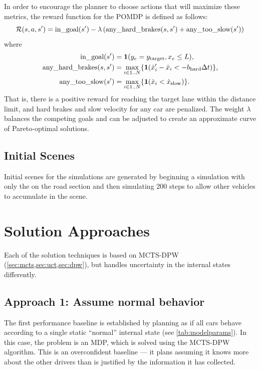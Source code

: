 In order to encourage the planner to choose actions that will maximize these metrics, the reward function for the POMDP is defined as follows: 
\begin{equation} \label{eqn:reward}
    \mathcal{R}(s, a, s') = \text{in\_goal}(s') - \lambda \left(\text{any\_hard\_brakes}(s, s') + \text{any\_too\_slow}(s')\right)
\end{equation}
where
\begin{align}
    \text{in\_goal}(s') &= \mathbf{1}({y}_e = y_\text{target}, {x}_e \leq L) \text{,}\\
    \text{any\_hard\_brakes}(s,s') &= \max_{i \in 1..N}\{\mathbf{1}({\dot{x}}_i' - {\dot{x}}_i < -b_\text{hard} \Delta t) \} \text{,}\\
    \text{any\_too\_slow}(s') &= \max_{i \in 1..N} \{\mathbf{1}({\dot{x}}_i < \dot{x}_\text{slow})\} \text{.}
\end{align}
That is, there is a positive reward for reaching the target lane within the distance limit, and hard brakes and slow velocity for any car are penalized.
The weight $\lambda$ balances the competing goals and can be adjusted to create an approximate curve of Pareto-optimal solutions.

\subsection{Initial Scenes} \label{sec:initial}

Initial scenes for the simulations are generated by beginning a simulation with only the \av{} on the road section and then simulating 200 steps to allow other vehicles to accumulate in the scene.

\section{Solution Approaches} \label{sec:solution}

Each of the solution techniques is based on MCTS-DPW (\cref{sec:mcts,sec:uct,sec:dpw}), but handles uncertainty in the internal states differently.

\subsection{Approach 1: Assume normal behavior}

The first performance baseline is established by planning as if all cars behave according to a single static ``normal'' internal state (see \cref{tab:modelparams}).
In this case, the problem is an MDP, which is solved using the MCTS-DPW algorithm.
This is an overconfident baseline --- it plans assuming it knows more about the other drivers than is justified by the information it has collected.

